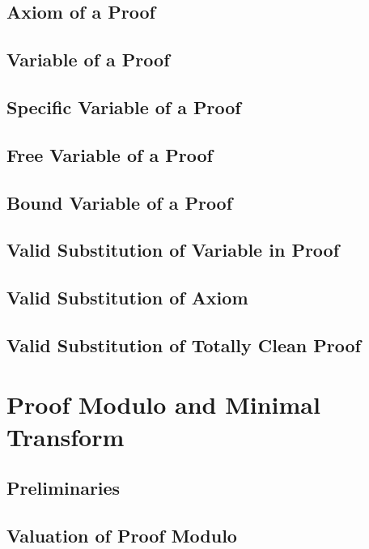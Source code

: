 \documentclass{report}
\begin{document}
    \subsection{Axiom of a Proof}
      
    \subsection{Variable of a Proof}
      
    \subsection{Specific Variable of a Proof}
      
    \subsection{Free Variable of a Proof}
      
    \subsection{Bound Variable of a Proof}
      
    \subsection{Valid Substitution of Variable in Proof}
      
    \subsection{Valid Substitution of Axiom}
      
    \subsection{Valid Substitution of Totally Clean Proof}
      
\section{Proof Modulo and Minimal Transform}
    \subsection{Preliminaries}
      
    \subsection{Valuation of Proof Modulo}
      
\end{document}
